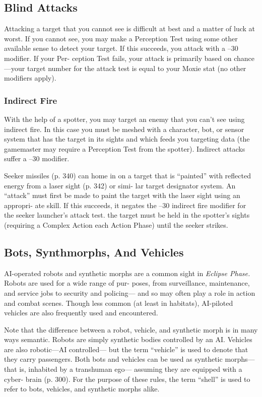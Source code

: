\subsection{Blind Attacks}

Attacking a target that you cannot see is 
difficult at best and a matter of luck at 
worst. If you cannot see, you may make a 
Perception Test using some other available 
sense to detect your target. If this succeeds, 
you attack with a –30 modifier. If your Per-
ception Test fails, your attack is primarily 
based on chance—your target number for 
the attack test is equal to your Moxie stat 
(no other modifiers apply).

\subsubsection{Indirect Fire}

With the help of a spotter, you may target 
an enemy that you can't see using indirect 
fire. In this case you must be meshed with 
a character, bot, or sensor system that has 
the target in its sights and which feeds 
you targeting data (the gamemaster may 
require a Perception Test from the spotter). 
Indirect attacks suffer a –30 modifier.

Seeker missiles (p. 340) can home in on 
a target that is ``painted'' with reflected 
energy from a laser sight (p. 342) or simi-
lar target designator system. An ``attack'' 
must first be made to paint the target 
with the laser sight using an appropri-
ate skill. If this succeeds, it negates the 
–30 indirect fire  modifier for the seeker 
launcher's attack test. the target must be 
held in the spotter's sights (requiring a 
Complex Action each Action Phase) until 
the seeker strikes.

\subsection{Bots, Synthmorphs, And Vehicles}

AI-operated robots and synthetic morphs 
are a common sight in \textit{Eclipse Phase.}
Robots are used for a wide range of pur-
poses, from surveillance, maintenance, 
and service jobs to security and policing—
and so may often play a role in action and 
combat scenes. Though less common (at 
least in habitats), AI-piloted vehicles are 
also frequently used and encountered.

Note that the difference between a 
robot, vehicle, and synthetic morph is in 
many ways semantic. Robots are simply 
synthetic bodies controlled by an AI. 
Vehicles are also robotic—AI controlled—
but the term ``vehicle'' is used to denote 
that they carry passengers. Both bots and 
vehicles can be used as synthetic morphs—
that is, inhabited by a transhuman ego—
assuming they are equipped with a cyber-
brain (p. 300). For the purpose of these 
rules, the term ``shell'' is used to refer to 
bots, vehicles, and synthetic morphs alike.

